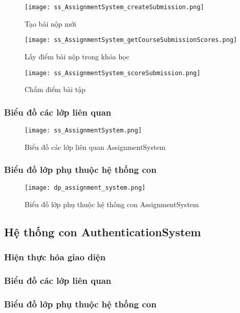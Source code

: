 \documentclass[./../main.tex]{subfiles}
\begin{document}
\begin{figure}[H]
    \centering
    \texttt{[image: ss\_AssignmentSystem\_createSubmission.png]}
    \caption{Tạo bài nộp mới}
    \label{ss_as_cs}
\end{figure}

\begin{figure}[H]
    \centering
    \texttt{[image: ss\_AssignmentSystem\_getCourseSubmissionScores.png]}
    \caption{Lấy điểm bài nộp trong khóa học}
    \label{ss_as_gcss}
\end{figure}

\begin{figure}[H]
    \centering
    \texttt{[image: ss\_AssignmentSystem\_scoreSubmission.png]}
    \caption{Chấm điểm bài tập}
    \label{ss_as_ss}
\end{figure}
\subsubsection{Biểu đồ các lớp liên quan}
\begin{figure}[H]
    \centering
    \texttt{[image: ss\_AssignmentSystem.png]}
    \caption{Biểu đồ các lớp liên quan AssignmentSystem}
    \label{ss_as}
\end{figure}
\subsubsection{Biểu đồ lớp phụ thuộc hệ thống con}
\begin{figure}[H]
    \centering
    \texttt{[image: dp\_assignment\_system.png]}
    \caption{Biểu đồ lớp phụ thuộc hệ thống con AssignmentSystem}
    \label{dp_as}
\end{figure}

\subsection{Hệ thống con AuthenticationSystem}
\subsubsection{Hiện thực hóa giao diện}
\subsubsection{Biểu đồ các lớp liên quan}
\subsubsection{Biểu đồ lớp phụ thuộc hệ thống con}
\end{document}
